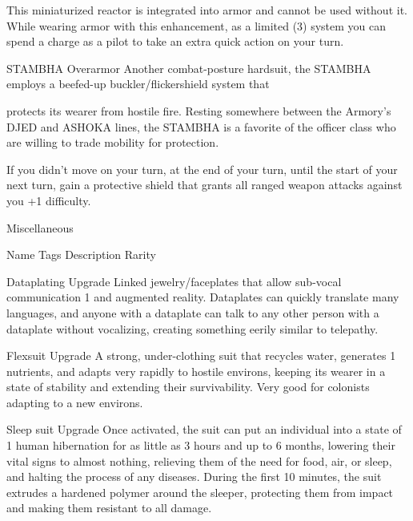This miniaturized reactor is integrated into armor and cannot be used without it. While wearing armor with  
this enhancement, as a limited (3) system you can spend a charge as a pilot to take an extra quick action  
on your turn.
 

STAMBHA Overarmor  
Another combat-posture hardsuit, the STAMBHA employs a beefed-up buckler/flickershield system that  

protects its wearer from hostile fire. Resting somewhere between the Armory’s DJED and ASHOKA lines,  
the STAMBHA is a favorite of the officer class who are willing to trade mobility for protection.   

If you didn’t move on your turn, at the end of your turn, until the start of your next turn, gain a protective  
shield that grants all ranged weapon attacks against you +1 difficulty.
 

                                                   Miscellaneous  

  Name                Tags         Description                                                               Rarity 

 Dataplating          Upgrade      Linked jewelry/faceplates that allow sub-vocal communication               1 
                                   and augmented reality. Dataplates can quickly translate many  
                                   languages, and anyone with a dataplate can talk to any other  
                                   person with a dataplate without vocalizing, creating something  
                                   eerily similar to telepathy. 

 Flexsuit             Upgrade      A strong, under-clothing suit that recycles water, generates               1 
                                   nutrients, and adapts very rapidly to hostile environs, keeping its  
                                   wearer in a state of stability and extending their survivability. Very  
                                   good for colonists adapting to a new environs. 

 Sleep suit           Upgrade      Once activated, the suit can put an individual into a state of             1 
                                   human hibernation for as little as 3 hours and up to 6 months,  
                                   lowering their vital signs to almost nothing, relieving them of the  
                                   need for food, air, or sleep, and halting the process of any  
                                   diseases. During the first 10 minutes, the suit extrudes a  
                                   hardened polymer around the sleeper, protecting them from  
                                   impact and making them resistant to all damage. 

